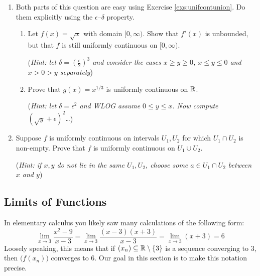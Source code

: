 \begin{exercises}
\begin{enumerate}
	
	  \item\label{exs:unifroots} Both parts of this question are easy using Exercise \ref{exs:unifcontunion}. Do them explicitly using the $\epsilon$--$\delta$ property.
	  \begin{enumerate}
	    \item Let $f(x)=\sqrt x$ with domain $[0,\infty)$. Show that $f'(x)$ is unbounded, but that $f$ is still uniformly continuous on $[0,\infty)$.\par
	    (\emph{Hint: let $\delta=(\frac\epsilon 2)^3$ and consider the cases $x\ge y\ge 0$, $x\le y\le 0$ and $x>0>y$ separately})
	    \item Prove that $g(x)=x^{1/3}$ is uniformly continuous on $\mathbb{R}$.\par
	    (\emph{Hint: let $\delta=\epsilon^2$ and WLOG assume $0\le y\le x$. Now compute $(\sqrt y+\epsilon)^2$\ldots })
	  \end{enumerate}


		\item\label{exs:unifcontunion} Suppose $f$ is uniformly continuous on intervals $U_1,U_2$ for which $U_1\cap U_2$ is non-empty. Prove that $f$ is uniformly continuous on $U_1\cup U_2$.\par
		(\emph{Hint: if $x,y$ do not lie in the same $U_1,U_2$, choose some $a\in U_1\cap U_2$ between $x$ and $y$})
		
	\end{enumerate}
\end{exercises}
\vfil
\goodbreak



\setcounter{subsection}{19}
\subsection{Limits of Functions}

In elementary calculus you likely saw many calculations of the following form:
\[
	\lim_{x\to 3}\frac{x^2-9}{x-3}
	=\lim_{x\to 3}\frac{(x-3)(x+3)}{x-3}
	=\lim_{x\to 3}(x+3)=6
\]
Loosely speaking, this means that if $(x_n)\subseteq\mathbb{R}\setminus\{3\}$ is a sequence converging to 3, then $\bigl(f(x_n)\bigr)$ converges to 6. Our goal in this section is to make this notation precise.

